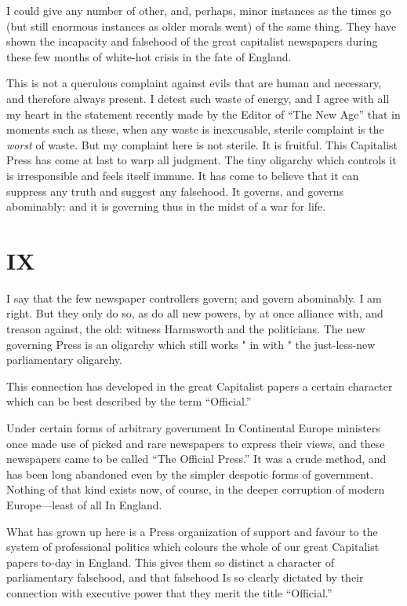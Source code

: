 \documentclass{book}
\begin{document}
I could give any number of other, and, perhaps, minor instances as the times go (but still enormous instances as older morals went) of the same thing. They have shown the incapacity and falsehood of the great capitalist newspapers during these few months of white-hot crisis in the fate of England.

This is not a querulous complaint against evils that are human and necessary, and therefore always present. I detest such waste of energy, and I agree with all my heart in the statement recently made by the Editor of “The New Age” that in moments such as these, when any waste is inexcusable, sterile complaint is the \emph{worst} of waste. But my complaint here is not sterile. It is fruitful. This Capitalist Press has come at last to warp all judgment. The tiny oligarchy which controls it is irresponsible and feels itself immune. It has come to believe that it can suppress any truth and suggest any falsehood. It governs, and governs abominably: and it is governing thus in the midst of a war for life.

\chapter*{IX}
\label{chapter-10}
I say that the few newspaper controllers govern; and govern abominably. I am right. But they only do so, as do all new powers, by at once alliance with, and treason against, the old: witness Harmsworth and the politicians. The new governing Press is an oligarchy which still works " in with " the just-less-new parliamentary oligarchy.

This connection has developed in the great Capitalist papers a certain character which can be best described by the term “Official.”

Under certain forms of arbitrary government In Continental Europe ministers once made use of picked and rare newspapers to express their views, and these newspapers came to be called “The Official Press.” It was a crude method, and has been long abandoned even by the simpler despotic forms of government. Nothing of that kind exists now, of course, in the deeper corruption of modern Europe—least of all In England.

What has grown up here is a Press organization of support and favour to the system of professional politics which colours the whole of our great Capitalist papers to-day in England. This gives them so distinct a character of parliamentary falsehood, and that falsehood Is so clearly dictated by their connection with executive power that they merit the title “Official.”
\end{document}
